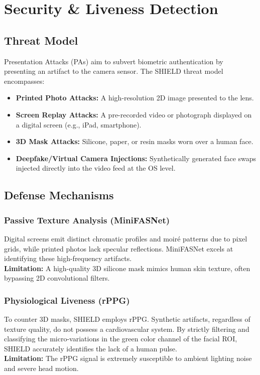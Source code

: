 \chapter{Security \& Liveness Detection}

\section{Threat Model}
Presentation Attacks (PAs) aim to subvert biometric authentication by presenting an artifact to the camera sensor. The SHIELD threat model encompasses:
\begin{itemize}
    \item \textbf{Printed Photo Attacks:} A high-resolution 2D image presented to the lens.
    \item \textbf{Screen Replay Attacks:} A pre-recorded video or photograph displayed on a digital screen (e.g., iPad, smartphone).
    \item \textbf{3D Mask Attacks:} Silicone, paper, or resin masks worn over a human face.
    \item \textbf{Deepfake/Virtual Camera Injections:} Synthetically generated face swaps injected directly into the video feed at the OS level.
\end{itemize}

\section{Defense Mechanisms}

\subsection{Passive Texture Analysis (MiniFASNet)}
Digital screens emit distinct chromatic profiles and moiré patterns due to pixel grids, while printed photos lack specular reflections. MiniFASNet excels at identifying these high-frequency artifacts. 
\\ \textbf{Limitation:} A high-quality 3D silicone mask mimics human skin texture, often bypassing 2D convolutional filters.

\subsection{Physiological Liveness (rPPG)}
To counter 3D masks, SHIELD employs rPPG. Synthetic artifacts, regardless of texture quality, do not possess a cardiovascular system. By strictly filtering and classifying the micro-variations in the green color channel of the facial ROI, SHIELD accurately identifies the lack of a human pulse.
\\ \textbf{Limitation:} The rPPG signal is extremely susceptible to ambient lighting noise and severe head motion.


